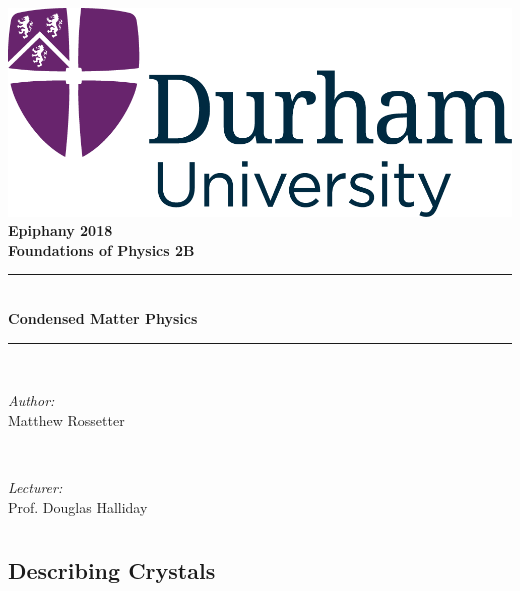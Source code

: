 \documentclass[a4paper,11pt,normalem]{article}
\newcommand{\HRule}{\rule{\linewidth}{0.5mm}}
\begin{document}
{\centering
{\includegraphics[scale=0.5]{../../logo0.png}\hfill{\Large\bfseries Epiphany 2018}}\\[1.5cm]
{\LARGE\bfseries Foundations of Physics 2B}\\[0.5cm]
\HRule \\[0.3cm]
{\huge\bfseries Condensed Matter Physics}\\[0.1cm]
\HRule \\[1cm]}
\begin{center}
\begin{minipage}{0.4\textwidth}
    \begin{flushleft} \large
        \emph{Author:} \\ Matthew Rossetter
    \end{flushleft}
\end{minipage}~
\begin{minipage}{0.4\textwidth}
    \begin{flushright} \large
        \emph{Lecturer:} \\ Prof. Douglas Halliday
    \end{flushright}
\end{minipage}
\end{center}
\section{}
\subsection{Describing Crystals}
\end{document}
